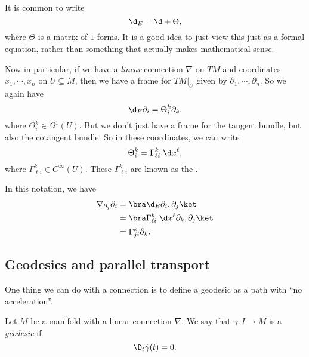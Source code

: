 \documentclass[a4paper]{article}
\begin{document}
It is common to write
\[
  \d_E = \d + \Theta,
\]
where $\Theta$ is a matrix of $1$-forms. It is a good idea to just view this just as a formal equation, rather than something that actually makes mathematical sense.

Now in particular, if we have a \emph{linear} connection $\nabla$ on $TM$ and coordinates $x_1, \cdots, x_n$ on $U \subseteq M$, then we have a frame for $TM|_U$ given by $\partial_1, \cdots, \partial_n$. So we again have
\[
  \d_E \partial_i = \Theta_i^k \partial_k.
\]
where $\Theta_i^k \in \Omega^1(U)$. But we don't just have a frame for the tangent bundle, but also the cotangent bundle. So in these coordinates, we can write
\[
  \Theta_i^k = \Gamma_{\ell i}^k\; \d x^\ell,
\]
where $\Gamma_{\ell i}^k \in C^\infty(U)$. These $\Gamma_{\ell i}^k$ are known as the .

In this notation, we have
\begin{align*}
  \nabla_{\partial_j} \partial_i &= \bra \d_E \partial_i, \partial_j\ket\\
  &= \bra \Gamma_{\ell i}^k \;\d x^\ell \partial_k, \partial_j\ket\\
  &= \Gamma^k_{ji} \partial_k.
\end{align*}

\subsection{Geodesics and parallel transport}
One thing we can do with a connection is to define a geodesic as a path with ``no acceleration''.
\begin{defi}[Geodesic]
  Let $M$ be a manifold with a linear connection $\nabla$. We say that $\gamma: I \to M$ is a \emph{geodesic} if
  \[
    \D_t \dot{\gamma}(t) = 0.
  \]
\end{defi}
\end{document}
